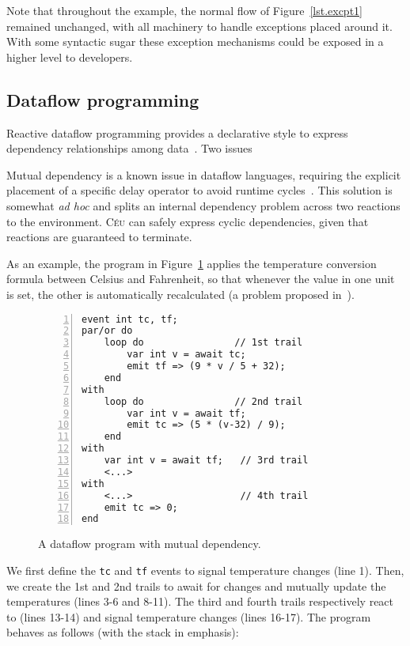 \documentclass{acm_proc_article-sp}
\newcommand{\CEU}{\textsc{C\'{e}u}\xspace}
\newcommand{\code}[1] {{\small{\texttt{#1}}}}
\newcommand{\1}{\;}
\newcommand{\2}{\;\;}
\newcommand{\3}{\;\;\;}
\newcommand{\5}{\;\;\;\;\;}
\begin{document}
Note that throughout the example, the normal flow of Figure~\ref{lst.excpt1} 
remained unchanged, with all machinery to handle exceptions placed around it.
With some syntactic sugar these exception mechanisms could be exposed in a 
higher level to developers.

\subsection{Dataflow programming}
\label{sec.adv.frp}

Reactive dataflow programming provides a declarative style to express 
dependency relationships among data~\cite{frp.survey}.
%
Two issues

Mutual dependency is a known issue in dataflow languages, requiring the 
explicit placement of a specific delay operator to avoid runtime
cycles~\cite{frtime.embedding,luagravity.sblp}.
This solution is somewhat \emph{ad hoc} and splits an internal dependency 
problem across two reactions to the environment.
%
\CEU can safely express cyclic dependencies, given that reactions are 
guaranteed to terminate.

As an example, the program in Figure~\ref{lst.frp2} applies the temperature 
conversion formula between Celsius and Fahrenheit, so that whenever the value 
in one unit is set, the other is automatically recalculated (a problem proposed 
in~\cite{frp.survey}).

\begin{figure}[t]
\begin{lstlisting}[numbers=left,xleftmargin=2em]
event int tc, tf;
par/or do
    loop do                // 1st trail
        var int v = await tc;
        emit tf => (9 * v / 5 + 32);
    end
with
    loop do                // 2nd trail
        var int v = await tf;
        emit tc => (5 * (v-32) / 9);
    end
with
    var int v = await tf;   // 3rd trail
    <...>
with
    <...>                   // 4th trail
    emit tc => 0;
end
\end{lstlisting}
\caption{ A dataflow program with mutual dependency.
\label{lst.frp2}
}
\end{figure}

We first define the \code{tc} and \code{tf} events to signal temperature 
changes (line 1).
Then, we create the 1st and 2nd trails to await for changes and mutually update 
the temperatures (lines 3-6 and 8-11).
The third and fourth trails respectively react to (lines 13-14) and signal 
temperature changes (lines 16-17).
The program behaves as follows (with the stack in emphasis):
\end{document}
